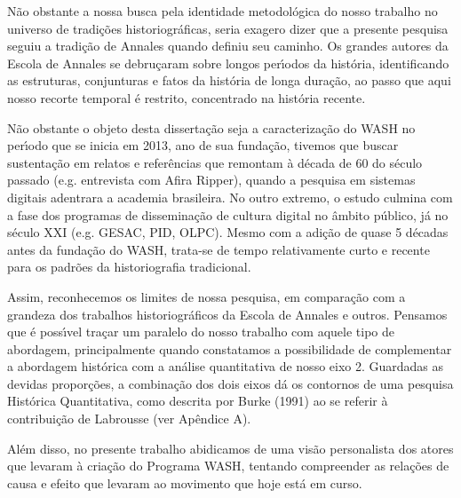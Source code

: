 \documentclass[
12pt,		%
openright,	%
twoside,  %
a4paper,			%
chapter=TITLE,		%
english,			%
french,				%
spanish,			%
brazil				%
]{USPSC-classe/USPSC}
\begin{document}
N\~ao obstante a nossa busca pela identidade metodol\'ogica do nosso trabalho no universo de tradi\c{c}\~oes historiogr\'aficas, seria exagero dizer que a presente pesquisa seguiu a tradi\c{c}\~ao de Annales quando definiu seu caminho.  Os grandes autores da Escola de Annales se debru\c{c}aram sobre longos per\'{\i}odos da hist\'oria, identificando as estruturas, conjunturas e fatos da \textquotedbl hist\'oria de longa dura\c{c}\~ao\textquotedbl , ao passo que aqui nosso recorte temporal \'e restrito, concentrado na hist\'oria recente.










N\~ao obstante o objeto desta disserta\c{c}\~ao seja a caracteriza\c{c}\~ao do WASH no per\'{\i}odo que se inicia em 2013, ano de sua funda\c{c}\~ao, tivemos que buscar sustenta\c{c}\~ao em relatos e refer\^encias que remontam \`a d\'ecada de 60 do s\'eculo passado (e.g. entrevista com Afira Ripper), quando a pesquisa em sistemas digitais adentrara a academia brasileira. No outro extremo, o estudo culmina com a fase dos programas de dissemina\c{c}\~ao de cultura digital no \^ambito p\'ublico, j\'a no s\'eculo XXI (e.g. GESAC, PID, OLPC).  Mesmo com a adi\c{c}\~ao de quase 5 d\'ecadas antes da funda\c{c}\~ao do WASH, trata-se de tempo relativamente curto e recente para os padr\~oes da historiografia tradicional.










Assim, reconhecemos os limites de nossa pesquisa, em compara\c{c}\~ao com a grandeza dos trabalhos historiogr\'aficos da Escola de Annales e outros. Pensamos que \'e poss\'{\i}vel tra\c{c}ar um paralelo do nosso trabalho com aquele tipo de abordagem, principalmente quando constatamos a possibilidade de complementar a abordagem hist\'orica com a an\'alise quantitativa de nosso eixo 2. Guardadas as devidas propor\c{c}\~oes, a combina\c{c}\~ao dos dois eixos d\'a os contornos de uma pesquisa Hist\'orica Quantitativa, como descrita por  Burke (1991) ao se referir \`a contribui\c{c}\~ao de Labrousse (ver Ap\^endice A).










Al\'em disso, no presente trabalho abidicamos de uma vis\~ao personalista dos atores que levaram \`a cria\c{c}\~ao do Programa WASH, tentando compreender as rela\c{c}\~oes de causa e efeito que levaram ao movimento que hoje est\'a em curso.
\end{document}
